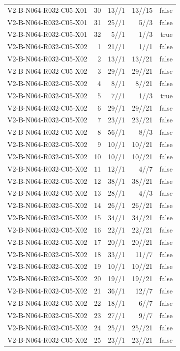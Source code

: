 {\begin{longtable}{lrrrr}
V2-B-N064-R032-C05-X01 & 30 & 13//1 & 13//15 & false \\
V2-B-N064-R032-C05-X01 & 31 & 25//1 & 5//3 & false \\
V2-B-N064-R032-C05-X01 & 32 & 5//1 & 1//3 & true \\
V2-B-N064-R032-C05-X02 & 1 & 21//1 & 1//1 & false \\
V2-B-N064-R032-C05-X02 & 2 & 13//1 & 13//21 & false \\
V2-B-N064-R032-C05-X02 & 3 & 29//1 & 29//21 & false \\
V2-B-N064-R032-C05-X02 & 4 & 8//1 & 8//21 & false \\
V2-B-N064-R032-C05-X02 & 5 & 7//1 & 1//3 & true \\
V2-B-N064-R032-C05-X02 & 6 & 29//1 & 29//21 & false \\
V2-B-N064-R032-C05-X02 & 7 & 23//1 & 23//21 & false \\
V2-B-N064-R032-C05-X02 & 8 & 56//1 & 8//3 & false \\
V2-B-N064-R032-C05-X02 & 9 & 10//1 & 10//21 & false \\
V2-B-N064-R032-C05-X02 & 10 & 10//1 & 10//21 & false \\
V2-B-N064-R032-C05-X02 & 11 & 12//1 & 4//7 & false \\
V2-B-N064-R032-C05-X02 & 12 & 38//1 & 38//21 & false \\
V2-B-N064-R032-C05-X02 & 13 & 28//1 & 4//3 & false \\
V2-B-N064-R032-C05-X02 & 14 & 26//1 & 26//21 & false \\
V2-B-N064-R032-C05-X02 & 15 & 34//1 & 34//21 & false \\
V2-B-N064-R032-C05-X02 & 16 & 22//1 & 22//21 & false \\
V2-B-N064-R032-C05-X02 & 17 & 20//1 & 20//21 & false \\
V2-B-N064-R032-C05-X02 & 18 & 33//1 & 11//7 & false \\
V2-B-N064-R032-C05-X02 & 19 & 10//1 & 10//21 & false \\
V2-B-N064-R032-C05-X02 & 20 & 19//1 & 19//21 & false \\
V2-B-N064-R032-C05-X02 & 21 & 36//1 & 12//7 & false \\
V2-B-N064-R032-C05-X02 & 22 & 18//1 & 6//7 & false \\
V2-B-N064-R032-C05-X02 & 23 & 27//1 & 9//7 & false \\
V2-B-N064-R032-C05-X02 & 24 & 25//1 & 25//21 & false \\
V2-B-N064-R032-C05-X02 & 25 & 23//1 & 23//21 & false \\

\end{longtable}}
